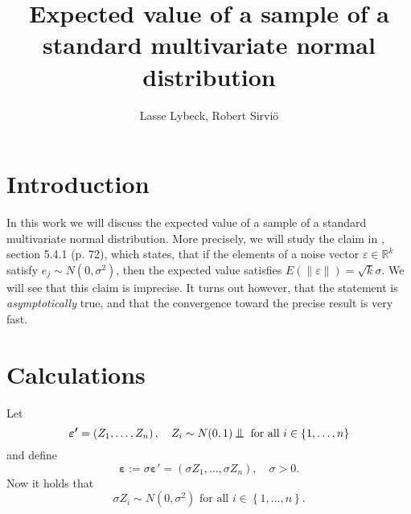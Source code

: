 \documentclass[12pt,a4]{article}
\title{Expected value of a sample of a standard multivariate normal distribution}
\author{Lasse Lybeck, Robert Sirviö}
\newcommand{\R}{{\mathbb R}}
\newcommand{\lnorm}{\left\|}
\newcommand{\rnorm}{\right\|}
\newcommand{\eps}{\ensuremath{\varepsilon}}
\newcommand{\vc}[1]{\ensuremath{\bm{#1}}}
\newcommand*{\bigCI}{%
  \mathrel{\text{%
    {\rotatebox[origin=c]{90}{\resizebox{2.25ex}{1.65ex}{$\vDash$}}}%
  }}%
}
\begin{document}
\maketitle

\section{Introduction}

In this work we will discuss the expected value of a sample of a standard multivariate normal distribution. More precisely, we will study the claim in \cite{samu}, section 5.4.1 (p. 72), which states, that if the elements of a noise vector $\eps \in \R^k$ satisfy $e_j \sim N(0, \sigma^2)$, then the expected value satisfies $E \left( \lnorm \eps \rnorm \right) = \sqrt{k} \sigma$. We will see that this claim is imprecise. It turns out however, that the statement is \emph{asymptotically} true, and that the convergence toward the precise result is very fast.

\section{Calculations}
\label{sec:calc}

Let
\begin{equation}
\vc{\eps'} = \left(Z_1, \ldots, Z_n \right), \quad Z_i \sim N(0,1) \bigCI \text{ for all }
i \in \left\{1, \ldots, n\right\} 
\end{equation}
and define
\begin{equation}
\label{eq:epsdef}
\vc{\eps} := \sigma \vc{\eps'} = \left(\sigma Z_1, \ldots, \sigma Z_n \right), \quad \sigma > 0.
\end{equation}
Now it holds that
\begin{equation}
\sigma Z_i \sim N\left(0,\sigma^2\right) \text{ for all }
i \in \left\{1, \ldots, n\right\}.
\end{equation}
\end{document}
